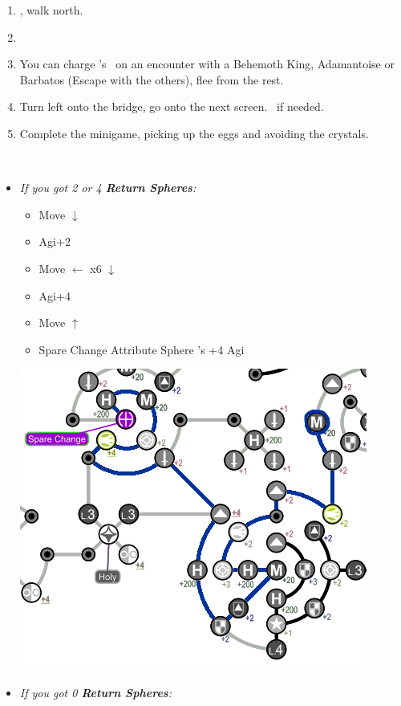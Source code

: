 \begin{enumerate}[resume]
	\item \sd, walk north.
	\item \formation{\tidus}{\kimahri}{\auron}
	\item You can charge \rikku's \od\ on an encounter with a Behemoth King, Adamantoise or Barbatos (Escape with the others), flee from the rest.
	\item Turn left onto the bridge, go onto the next screen. \save\ if needed.
	\item Complete the minigame, picking up the eggs and avoiding the crystals.
\end{enumerate}
\bothvfill\winvfill\lossvfill
\ 
\colend
\begin{spheregrid}
	\begin{multicols}{2}
		\begin{itemize}
			\item \textit{If you got 2 or 4 \textbf{Return Spheres}:}
				\begin{itemize}
					\item Move $\downarrow$
					\item Agi+2
					\item Move $\leftarrow$ x6 $\downarrow$
					\item Agi+4
					\item Move $\uparrow$
					\item Spare Change
					\yunaf Attribute Sphere \kimahri's +4 Agi
				\end{itemize}
				\includegraphics[width=.8\columnwidth]{graphics/4_Return_final_grid}
			\item \textit{If you got 0 \textbf{Return Spheres}:}

\end{itemize}
\end{multicols}
\end{spheregrid}
